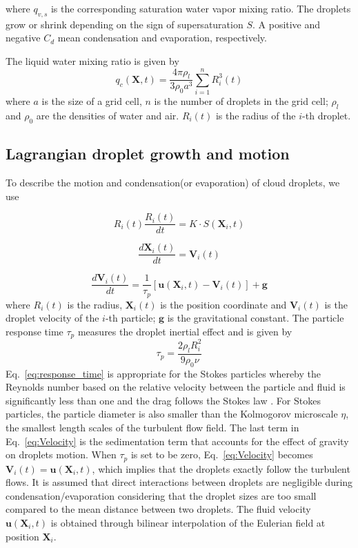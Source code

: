 \documentclass[draft,linenumbers]{AGUJournal}
\newcommand{\Eq}[1]{Eq.~\eqref{#1}} \newcommand{\Fig}[1]{Figure~\ref{#1}}
\begin{document}
where $q_{v,s}$ is the corresponding saturation water vapor mixing ratio. The droplets 
grow or shrink depending on the sign of supersaturation $S$. A positive and negative 
$C_d$ mean condensation and evaporation, respectively.

The liquid water mixing ratio is given by
\begin{equation}
q_{c}(\mathbf{X},t)=\frac{4\pi\rho_{l}}{3\rho_{0}a^{3}}\sum_{i=1}^{n}R_{i}^{3}(t)\label{eq:cloud_water}
\end{equation}
where $a$ is the size of a grid cell, $n$ is the number of droplets
in the grid cell; $\rho_{l}$ and $\rho_{0}$ are the densities of water and air. $R_{i}(t)$ is the radius of the $i$-th droplet.

\subsection{Lagrangian droplet growth and motion}

To describe the motion and condensation(or evaporation) of cloud droplets, we use

\begin{equation}
R_i(t)\frac{R_i(t)}{dt}=K\cdot S(\mathbf{X}_i,t)\label{eq:Radius}
\end{equation}


\begin{equation}
\frac{d\mathbf{X}_i(t)}{dt}=\mathbf{V}_i(t)\label{eq:Coords}
\end{equation}


\begin{equation}
\frac{d\mathbf{V}_i(t)}{dt}=\frac{1}{\tau_{p}}[\mathbf{u}(\mathbf{X}_i,t)-\mathbf{V}_i(t)]+\mathbf{g}\label{eq:Velocity}
\end{equation}
where $R_i(t)$ is the radius, $\mathbf{X}_i(t)$ is the position
coordinate and $\mathbf{V}_i(t)$ is the droplet velocity of the $i$-th particle; $\mathbf{g}$ is the gravitational constant.
The particle response time $\tau_p$ measures the droplet inertial effect and is given by
\begin{equation}
\tau_{p}=\frac{2\rho_{l}R_i^{2}}{9\rho_{0}\nu}
\label{eq:response_time}
\end{equation}
\Eq{eq:response_time} is appropriate for the Stokes particles whereby the Reynolds number 
based on the relative velocity between the particle and fluid is significantly less than one and the 
drag follows the Stokes law \citep{Eaton94}. For Stokes particles, the particle diameter is also smaller than the Kolmogorov microscale $\eta$, the smallest length scales of the turbulent flow field.
The last term in \Eq{eq:Velocity} is the sedimentation term that accounts for the effect of 
gravity on droplets motion. When $\tau_{p}$ is set to be zero, \Eq{eq:Velocity} becomes $\mathbf{V}_i(t)=\mathbf{u}(\mathbf{X}_i,t)$, 
which implies that the droplets exactly follow the turbulent flows. 
It is assumed that direct interactions between droplets are negligible during 
condensation/evaporation considering that the droplet sizes are too small compared to the mean distance between two droplets. The fluid velocity $\mathbf{u}(\mathbf{X}_i, t)$ 
is obtained through bilinear interpolation of the Eulerian field at position $\mathbf{X}_i$.
\end{document}
